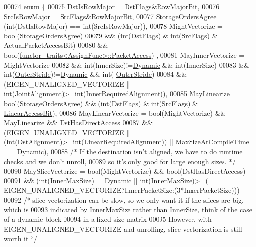 \begin{DoxyCode}
00074   \textcolor{keyword}{enum} \{
00075     DstIsRowMajor = DstFlags&\hyperlink{group__flags_gae4f56c2a60bbe4bd2e44c5b19cbe8762}{RowMajorBit},
00076     SrcIsRowMajor = SrcFlags&\hyperlink{group__flags_gae4f56c2a60bbe4bd2e44c5b19cbe8762}{RowMajorBit},
00077     StorageOrdersAgree = (int(DstIsRowMajor) == int(SrcIsRowMajor)),
00078     MightVectorize = \textcolor{keywordtype}{bool}(StorageOrdersAgree)
00079                   && (int(DstFlags) & int(SrcFlags) & ActualPacketAccessBit)
00080                   && \textcolor{keywordtype}{bool}(\hyperlink{struct_eigen_1_1internal_1_1functor__traits}{functor\_traits<AssignFunc>::PacketAccess})
      ,
00081     MayInnerVectorize  = MightVectorize
00082                        && int(InnerSize)!=\hyperlink{namespace_eigen_ad81fa7195215a0ce30017dfac309f0b2}{Dynamic} && int(InnerSize)%
00083                        && int(\hyperlink{class_eigen_1_1_outer_stride}{OuterStride})!=\hyperlink{namespace_eigen_ad81fa7195215a0ce30017dfac309f0b2}{Dynamic} && int(
      \hyperlink{class_eigen_1_1_outer_stride}{OuterStride})%
00084                        && (EIGEN\_UNALIGNED\_VECTORIZE  || int(JointAlignment)>=int(InnerRequiredAlignment)),
00085     MayLinearize = \textcolor{keywordtype}{bool}(StorageOrdersAgree) && (int(DstFlags) & int(SrcFlags) & 
      \hyperlink{group__flags_ga4b983a15d57cd55806df618ac544d09e}{LinearAccessBit}),
00086     MayLinearVectorize = \textcolor{keywordtype}{bool}(MightVectorize) && MayLinearize && DstHasDirectAccess
00087                        && (EIGEN\_UNALIGNED\_VECTORIZE || (int(DstAlignment)>=int(LinearRequiredAlignment)) 
      || MaxSizeAtCompileTime == \hyperlink{namespace_eigen_ad81fa7195215a0ce30017dfac309f0b2}{Dynamic}),
00088       \textcolor{comment}{/* If the destination isn't aligned, we have to do runtime checks and we don't unroll,}
00089 \textcolor{comment}{         so it's only good for large enough sizes. */}
00090     MaySliceVectorize  = bool(MightVectorize) && bool(DstHasDirectAccess)
00091                        && (int(InnerMaxSize)==\hyperlink{namespace_eigen_ad81fa7195215a0ce30017dfac309f0b2}{Dynamic} || int(InnerMaxSize)>=(
      EIGEN\_UNALIGNED\_VECTORIZE?InnerPacketSize:(3*InnerPacketSize)))
00092       \textcolor{comment}{/* slice vectorization can be slow, so we only want it if the slices are big, which is}
00093 \textcolor{comment}{         indicated by InnerMaxSize rather than InnerSize, think of the case of a dynamic block}
00094 \textcolor{comment}{         in a fixed-size matrix}
00095 \textcolor{comment}{         However, with EIGEN\_UNALIGNED\_VECTORIZE and unrolling, slice vectorization is still worth it */}

\end{DoxyCode}
